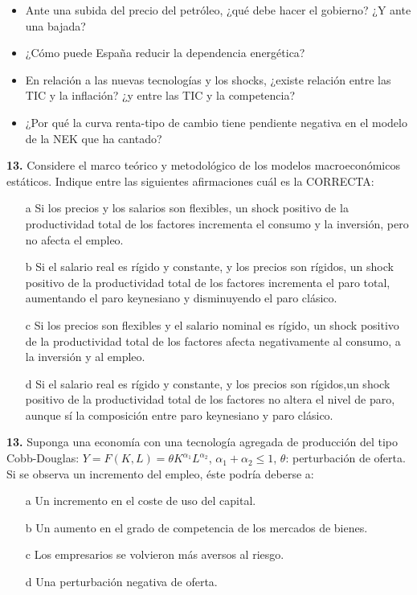 \documentclass{nuevotema}
\begin{document}

\begin{itemize}
    \item Ante una subida del precio del petróleo, ¿qué debe hacer el gobierno? ¿Y ante una bajada?
    \item ¿Cómo puede España reducir la dependencia energética?
    \item En relación a las nuevas tecnologías y los shocks, ¿existe relación entre las TIC y la inflación? ¿y entre las TIC y la competencia?
    \item ¿Por qué la curva renta-tipo de cambio tiene pendiente negativa en el modelo de la NEK que ha cantado?
\end{itemize}


\textbf{13.} Considere el marco teórico y metodológico de los modelos macroeconómicos estáticos. Indique entre las siguientes afirmaciones cuál es la CORRECTA:

\begin{itemize}
	\item[a] Si los precios y los salarios son flexibles, un shock positivo de la productividad total de los factores incrementa el consumo y la inversión, pero no afecta el empleo.
	\item[b] Si el salario real es rígido y constante, y los precios son rígidos, un shock positivo de la productividad total de los factores incrementa el paro total, aumentando el paro keynesiano y disminuyendo el paro clásico.
	\item[c] Si los precios son flexibles y el salario nominal es rígido, un shock positivo de la productividad total de los factores afecta negativamente al consumo, a la inversión y al empleo.
	\item[d] Si el salario real es rígido y constante, y los precios son rígidos,un shock positivo de la productividad total de los factores no altera el nivel de paro, aunque sí la composición entre paro keynesiano y paro clásico.
\end{itemize}


\textbf{13.} Suponga una economía con una tecnología agregada de producción del tipo Cobb-Douglas: $Y=F(K,L) = \theta K^{\alpha_1} L^{\alpha_2}$, $\alpha_1 + \alpha_2 \leq 1$, $\theta$: perturbación de oferta. Si se observa un incremento del empleo, éste podría deberse a:

\begin{itemize}
	\item[a] Un incremento en el coste de uso del capital.
	\item[b] Un aumento en el grado de competencia de los mercados de bienes.
	\item[c] Los empresarios se volvieron más aversos al riesgo.
	\item[d] Una perturbación negativa de oferta.
\end{itemize}
\end{document}

